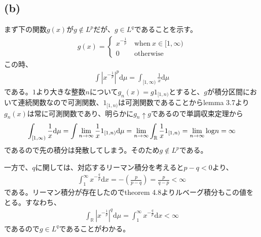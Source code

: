\documentclass{article}
\begin{document}
\subsection{(b)}
まず下の関数$g(x)$が$g \notin L^p$だが、$g\in L^q$であることを示す。
\begin{align*}
	g(x) = \begin{cases}
	x^{-\frac{1}{p}}\ &\text{when}\ x \in [1, \infty)\\
	0\ &\text{otherwise}
	\end{cases}
\end{align*}
この時、
\begin{align*}
	\int |x^{-\frac{1}{p}}|^{p} \mathrm{d}\mu = \int_{[1,\infty)} \frac{1}{x} \mathrm{d}\mu
\end{align*}
である。$1$より大きな整数$n$について$g_n (x) = g1_{[1,n)}$とすると、$g$が積分区間において連続関数なので可測関数、$1_{[1,n)}$は可測関数であることからlemma 3.7より$g_n (x)$は常に可測関数であり、明らかに$g_n \uparrow g$であるので単調収束定理から
\begin{align*}
	\int_{[1,\infty)} \frac{1}{x} \mathrm{d}\mu = \int \lim_{n \to \infty} \frac{1}{x} 1_{[1, n)} \mathrm{d}\mu = \lim_{n \to \infty} \int_{\mathbb{R}} \frac{1}{x} 1_{[1, n)} = \lim_{n \to \infty} {\rm log} n = \infty
\end{align*}
であるので先の積分は発散してしまう。そのため$g\notin L^p$である。

一方で、$q$に関しては、対応するリーマン積分を考えると$p-q < 0$より、
\begin{align*}
	\int_1^{\infty} x^{-\frac{q}{p}} \mathrm{d}x = -\left( \frac{p}{p-q} \right) = \frac{p}{q-p} < \infty
\end{align*}
である。リーマン積分が存在したのでtheorem 4.8よりルベーグ積分もこの値をとる。すなわち、
\begin{align*}
	\int_{\mathbb{R}} |x^{-\frac{1}{p}}|^q \mathrm{d}\mu = \int_1^{\infty} x^{-\frac{q}{p}} \mathrm{d}x < \infty
\end{align*}
であるので$g \in L^q$であることがわかる。
\end{document}
